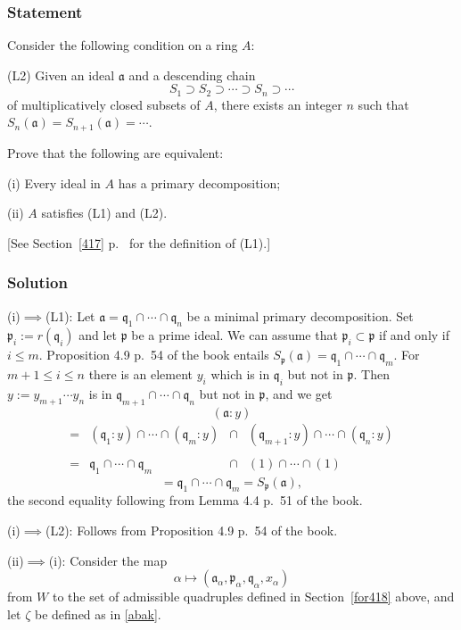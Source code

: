 \documentclass[parskip=half,fontsize=12pt]{scrartcl}%
\newcommand{\mf}{\mathfrak}
\newcommand{\aaa}{\mf a}
\newcommand{\ppp}{\mf p}
\newcommand{\qqq}{\mf q}
\begin{document}
\subsubsection{Statement}%

Consider the following condition on a ring $A$:

(L2) Given an ideal $\mathfrak a$ and a descending chain 
$$
S_1\supset S_2\supset\cdots\supset S_n\supset\cdots
$$ 
of multiplicatively closed subsets of $A$, there exists an integer $n$ such that $S_n(\mathfrak a)=S_{n+1}(\mathfrak a)=\cdots$. %

Prove that the following are equivalent:

(i) Every ideal in $A$ has a primary decomposition;

(ii) $A$ satisfies (L1) and (L2).

[See Section~\ref{417} p.~\pageref{417} for the definition of (L1).]

\subsubsection{Solution}%

(i)$\implies$(L1): Let $\aaa=\qqq_1\cap\cdots\cap\qqq_n$ be a minimal primary decomposition. Set $\ppp_i:=r(\qqq_i)$ and let $\ppp$ be a prime ideal. We can assume that $\ppp_i\subset\ppp$ if and only if $i\le m$. Proposition 4.9 p.~54 of the book entails $S_\ppp(\aaa)=\qqq_1\cap\cdots\cap\qqq_m$. For $m+1\le i\le n$ there is an element $y_i$ which is in $\qqq_i$ but not in $\ppp$. Then $y:=y_{m+1}\cdots y_n$ is in $\qqq_{m+1}\cap\cdots\cap\qqq_n$ but not in $\ppp$, and we get 
$$
(\aaa:y)
$$
$$
\begin{matrix}
=&(\qqq_1:y)\cap\cdots\cap(\qqq_m:y)&\cap&(\qqq_{m+1}:y)\cap\cdots\cap(\qqq_n:y)\\ \\ 
=&\qqq_1\cap\cdots\cap\qqq_m&\cap&(1)\cap\cdots\cap(1)
\end{matrix}
$$
$$
=\qqq_1\cap\cdots\cap\qqq_m=S_\ppp(\aaa),
$$ 
the second equality following from Lemma 4.4 p.~51 of the book.

(i)$\implies$(L2): Follows from Proposition 4.9 p.~54 of the book.

(ii)$\implies$(i): %
Consider the map 
$$
\alpha\mapsto(\aaa_\alpha,\ppp_\alpha,\qqq_\alpha,x_\alpha)
$$
from $W$ to the set of admissible quadruples defined in Section~\ref{for418} above, and let $\zeta$ be defined as in \eqref{abak}. 
\end{document}
